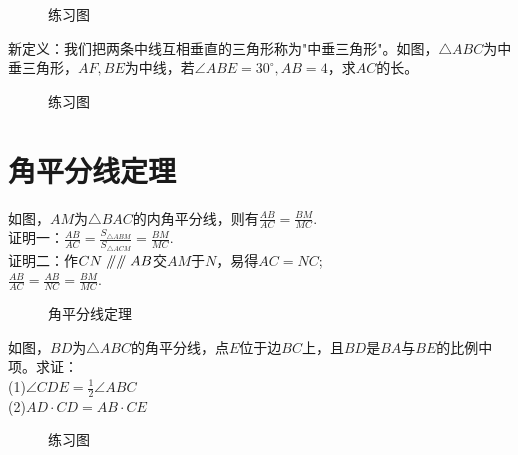 \begin{figure}[H]
    \centering
    \resizebox{4cm}{!}{}
    \caption{练习图}
\end{figure}
\begin{problem}
新定义：我们把两条中线互相垂直的三角形称为"中垂三角形"。如图，$\triangle ABC$为中垂三角形，$AF,BE$为中线，若$\angle ABE=30^\circ,AB=4$，求$AC$的长。
\end{problem}
\begin{figure}[H]
    \centering
    \resizebox{4cm}{!}{}
    \caption{练习图}
\end{figure}
\clearpage
\section{角平分线定理}
\begin{definition}
    如图，$AM$为$\triangle BAC$的内角平分线，则有$\frac{AB}{AC}=\frac{BM}{MC}.$ \\
    证明一：$\frac{AB}{AC}=\frac{S_{\triangle ABM}}{S_{\triangle ACM}}=\frac{BM}{MC}$. \\
    证明二：作$CN\mathrel{/\mkern-5mu/} \mathrel{/\mkern-5mu/} AB$交$AM$于$N$，易得$AC=NC$; \\
    $\frac{AB}{AC}=\frac{AB}{NC}=\frac{BM}{MC}.$
\end{definition}
\begin{figure}[H]
    \centering
    \resizebox{4cm}{!}{}
    \caption{角平分线定理}
\end{figure}
\begin{problem}
如图，$BD$为$\triangle ABC$的角平分线，点$E$位于边$BC$上，且$BD$是$BA$与$BE$的比例中项。求证：\\
(1)$\angle CDE=\frac{1}{2}\angle ABC$ \\
(2)$AD·CD=AB·CE$
\end{problem}
\begin{figure}[H]
    \centering
    \resizebox{4cm}{!}{}
    \caption{练习图}
\end{figure}
\clearpage

